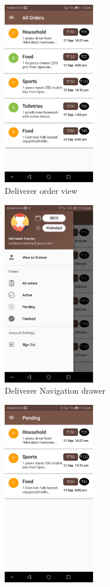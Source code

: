 \documentclass{report}
\begin{document}
\begin{figure}[h!]
\begin{subfigure}[h!]{.24\textwidth}
\centering
\includegraphics[width=4cm]{deliverer_view.jpg}
\caption{\centering \tiny Deliverer order view}
\end{subfigure}
\begin{subfigure}[h!]{.24\textwidth}
\centering
\includegraphics[width=4cm]{deliverer_drawer.jpg}
\caption{\centering \tiny Deliverer Navigation drawer}
\end{subfigure}
\begin{subfigure}[h!]{.24\textwidth}
\centering
\includegraphics[width=4cm]{pending_orders.jpg}

\end{subfigure}
\end{figure}
\end{document}
